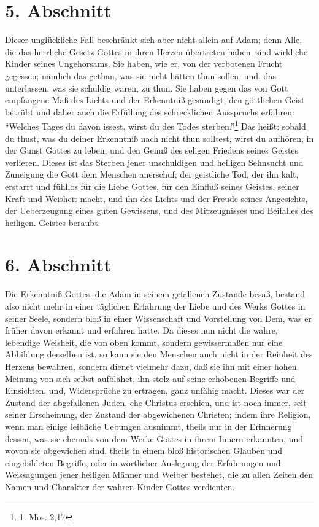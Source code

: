\section{5. Abschnitt} \label{kap7_ab5}

Dieser unglückliche Fall beschränkt sich aber nicht allein auf Adam; denn Alle,
die das herrliche Gesetz Gottes in ihren Herzen übertreten haben, sind wirkliche
Kinder seines Ungehorsams. Sie haben, wie er, von der verbotenen Frucht
gegessen; nämlich das gethan, was sie nicht hätten thun sollen, und. das
unterlassen, was sie schuldig waren, zu thun. Sie haben gegen das von Gott
empfangene Maß des Lichts und der Erkenntniß gesündigt, den göttlichen Geist
betrübt und daher auch die Erfüllung des schrecklichen Ausspruchs erfahren:
"`Welches Tages du davon issest, wirst du des Todes sterben."'\footnote{1. Mos.
2,17} Das heißt: sobald du thust, was du deiner Erkenntniß nach nicht thun
solltest, wirst du aufhören, in der Gunst Gottes zu leben, und den Genuß des
seligen Friedens seines Geistes verlieren. Dieses ist das Sterben jener
unschuldigen und heiligen Sehnsucht und Zuneigung die Gott dem Menschen
anerschuf; der geistliche Tod, der ihn kalt, erstarrt und fühllos für die Liebe
Gottes, für den Einfluß seines Geistes, seiner Kraft und Weisheit macht, und ihn
des Lichts und der Freude seines Angesichts, der Ueberzeugung eines guten
Gewissens, und des Mitzeugnisses und Beifalles des heiligen. Geistes beraubt.

\section{6. Abschnitt} \label{kap7_ab6}

Die Erkenntniß Gottes, die Adam in seinem gefallenen Zustande besaß, bestand
also nicht mehr in einer täglichen Erfahrung der Liebe und des Werks Gottes in
seiner Seele, sondern bloß in einer Wissenschaft und Vorstellung von Dem, was er
früher davon erkannt und erfahren hatte. Da dieses nun nicht die wahre,
lebendige Weisheit, die von oben kommt, sondern gewissermaßen nur eine Abbildung
derselben ist, so kann sie den Menschen auch nicht in der Reinheit des Herzens
bewahren, sondern dienet vielmehr dazu, daß sie ihn mit einer hohen Meinung von
sich selbst aufblähet, ihn stolz auf seine erhobenen Begriffe und Einsichten,
und, Widersprüche zu ertragen, ganz unfähig macht. Dieses war der Zustand der
abgefallenen Juden, ehe Christus erschien, und ist noch immer, seit seiner
Erscheinung, der Zustand der abgewichenen Christen; indem ihre Religion, wenn
man einige leibliche Uebungen ausnimmt, theils nur in der Erinnerung dessen, was
sie ehemals von dem Werke Gottes in ihrem Innern erkannten, und wovon sie
abgewichen sind, theils in einem bloß historischen Glauben und eingebildeten
Begriffe, oder in wörtlicher Auslegung der Erfahrungen und Weissagungen jener
heiligen Männer und Weiber bestehet, die zu allen Zeiten den Namen und Charakter
der wahren Kinder Gottes verdienten.


